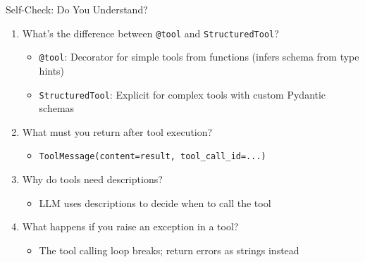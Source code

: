 \documentclass[aspectratio=169,11pt]{beamer}
\begin{document}
\begin{frame}[fragile]{Self-Check: Do You Understand?}
\begin{enumerate}\setlength{\itemsep}{1pt}
  \item What's the difference between \texttt{@tool} and \texttt{StructuredTool}?
    \begin{itemize}\setlength{\itemsep}{1pt}\small
      \item \texttt{@tool}: Decorator for simple tools from functions (infers schema from type hints)
      \item \texttt{StructuredTool}: Explicit for complex tools with custom Pydantic schemas
    \end{itemize}

  \item What must you return after tool execution?
    \begin{itemize}\setlength{\itemsep}{1pt}\small
      \item \texttt{ToolMessage(content=result, tool\_call\_id=...)}
    \end{itemize}

  \item Why do tools need descriptions?
    \begin{itemize}\setlength{\itemsep}{1pt}\small
      \item LLM uses descriptions to decide when to call the tool
    \end{itemize}

  \item What happens if you raise an exception in a tool?
    \begin{itemize}\setlength{\itemsep}{1pt}\small
      \item The tool calling loop breaks; return errors as strings instead
    \end{itemize}
\end{enumerate}
\end{frame}
\end{document}
